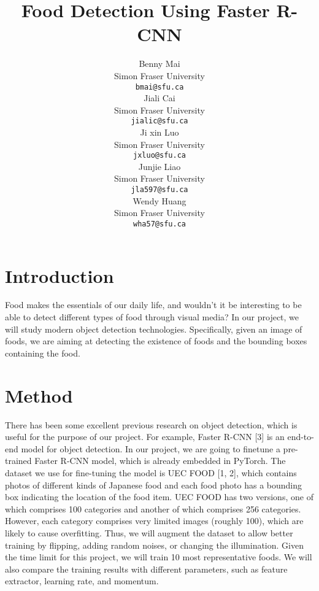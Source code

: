 \documentclass{article} %
\title{Food Detection Using Faster R-CNN}
\author{
Benny Mai\\
Simon Fraser University\\
\texttt{bmai@sfu.ca} \\
\And
Jiali Cai \\
Simon Fraser University\\
\texttt{jialic@sfu.ca} \\
\AND
Ji xin Luo \\
Simon Fraser University\\
\texttt{jxluo@sfu.ca} \\
\And
Junjie Liao \\
Simon Fraser University\\
\texttt{jla597@sfu.ca} \\
\And
Wendy Huang \\
Simon Fraser University\\
\texttt{wha57@sfu.ca} \\
}
\begin{document}
\maketitle


\section{Introduction}

Food makes the essentials of our daily life, and wouldn't it be interesting to be able to detect different types of food through visual media? In our project, we will study modern object detection technologies. Specifically, given an image of foods, we are aiming at detecting the existence of foods and the bounding boxes containing the food.

\section{Method}

There has been some excellent previous research on object detection, which is useful for the purpose of our project. For example, Faster R-CNN [3] is an end-to-end model for object detection. In our project, we are going to finetune a pre-trained Faster R-CNN model, which is already embedded in PyTorch. The dataset we use for fine-tuning the model is UEC FOOD [1, 2], which contains photos of different kinds of Japanese food and each food photo has a bounding box indicating the location of the food item. UEC FOOD has two versions, one of which comprises 100 categories and another of which comprises 256 categories. However, each category comprises very limited images (roughly 100), which are likely to cause overfitting. Thus, we will augment the dataset to allow better training by flipping, adding random noises, or changing the illumination. Given the time limit for this project, we will train 10 most representative foods. We will also compare the training results with different parameters, such as feature extractor, learning rate, and momentum.
\end{document}

